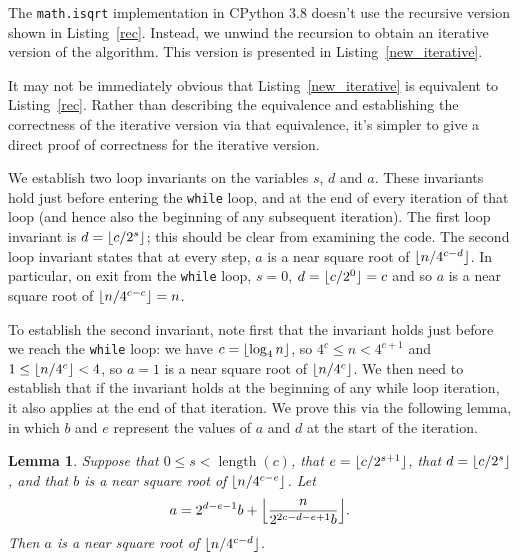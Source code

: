 \documentclass[a4paper]{article}
\DeclarePairedDelimiter\floor{\lfloor}{\rfloor}
\DeclareMathOperator{\length}{length}
\theoremstyle{plain}
\newtheorem{lemma}[theorem]{Lemma}
\theoremstyle{definition}
\begin{document}
The \lstinline{math.isqrt} implementation in CPython 3.8 doesn't use the
recursive version shown in Listing~\ref{rec}. Instead, we unwind the recursion
to obtain an iterative version of the algorithm. This version is presented in
Listing~\ref{new_iterative}.



It may not be immediately obvious that Listing~\ref{new_iterative} is
equivalent to Listing~\ref{rec}. Rather than describing the equivalence and
establishing the correctness of the iterative version via that equivalence,
it's simpler to give a direct proof of correctness for the iterative version.

We establish two loop invariants on the variables $s$, $d$ and $a$. These
invariants hold just before entering the \lstinline$while$ loop, and at the end
of every iteration of that loop (and hence also the beginning of any subsequent
iteration). The first loop invariant is $d = \floor{c/2^s}$; this should be
clear from examining the code. The second loop invariant states that at every
step, $a$ is a near square root of $\floor{n / 4^{c-d}}$. In particular, on exit
from the \lstinline$while$ loop, $s = 0$, $d = \floor{c/2^0} = c$ and so $a$ is
a near square root of $\floor{n / 4^{c-c}} = n$.

To establish the second invariant, note first that the invariant holds just
before we reach the \lstinline$while$ loop: we have $c = \floor{\log_4 n}$, so
$4^c \le n < 4^{c+1}$ and $1 \le \floor{n / 4^c} < 4$, so $a = 1$ is a near
square root of $\floor{n / 4^c}$. We then need to establish that if the
invariant holds at the beginning of any while loop iteration, it also applies
at the end of that iteration. We prove this via the following lemma, in which
$b$ and $e$ represent the values of $a$ and $d$ at the start of the iteration.

\begin{lemma}
  Suppose that $0 \le s < \length(c)$, that $e = \floor{c / 2^{s + 1}}$, that $d =
  \floor{c / 2^s}$, and that $b$ is a near square root of $\floor{n /
  4^{c-e}}$. Let
  $$a = 2^{d-e-1}b + \floor*{\frac{n}{2^{2c-d-e+1}b}}.$$ Then $a$ is a near
  square root of $\floor{n / 4^{c-d}}$.
\end{lemma}
\end{document}
